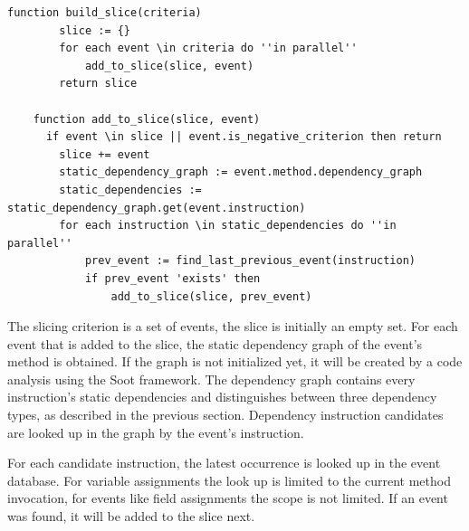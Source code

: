 ﻿\documentclass[
      english,
			conference,
      ]{IEEEtran}
\begin{document}
\begin{lstlisting}[numberfirstline=true,float,language=algorithm,firstnumber=1,label=lst:slicealgo,caption={Algorithm for building the slice}]
	function build_slice(criteria)
		slice := {}
		for each event \in criteria do ''in parallel''
			add_to_slice(slice, event)
		return slice
		
	function add_to_slice(slice, event)
	  if event \in slice || event.is_negative_criterion then return
		slice += event
		static_dependency_graph := event.method.dependency_graph
		static_dependencies := static_dependency_graph.get(event.instruction)
		for each instruction \in static_dependencies do ''in parallel''
			prev_event := find_last_previous_event(instruction)
			if prev_event 'exists' then
				add_to_slice(slice, prev_event)
\end{lstlisting}



The slicing criterion is a set of events, the slice is initially an empty set.
For each event that is added to the slice, the static dependency graph of the event's method is obtained.
If the graph is not initialized yet, it will be created by a code analysis using the Soot framework.
The dependency graph contains every instruction's static dependencies and distinguishes between three dependency types, as described in the previous section.
Dependency instruction candidates are looked up in the graph by the event's instruction.

For each candidate instruction, the latest occurrence is looked up in the event database.
For variable assignments the look up is limited to the current method invocation, for events like field assignments the scope is not limited.
If an event was found, it will be added to the slice next.
\end{document}
